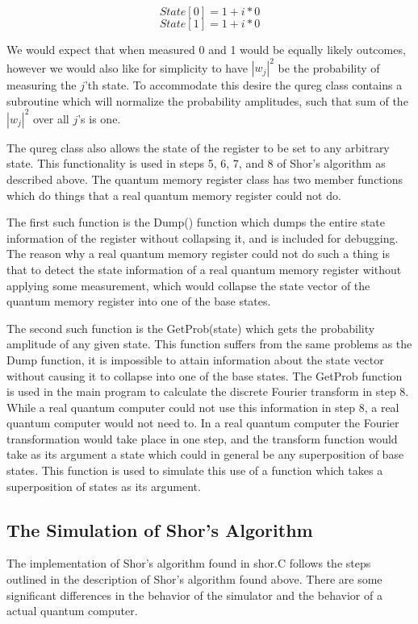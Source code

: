 \documentclass[]{article}
\begin{document}
\[State[0] = 1 + i * 0\] 
\[State[1] = 1 + i * 0\] 

We would expect that when measured 0 and 1 would be equally likely
outcomes, however we would also like for simplicity to have
$|w_{j}|^{2}$ be the probability of measuring the $j$'th state. To
accommodate this desire the qureg class contains a subroutine which
will normalize the probability amplitudes, such that sum of the
$|w_{j}|^{2}$ over all $j$'s is one.

The qureg class also allows the state of the register to be set to any
arbitrary state.  This functionality is used in steps 5, 6, 7, and 8
of Shor's algorithm as described above.  The quantum memory register
class has two member functions which do things that a real quantum
memory register could not do.

The first such function is the Dump() function which dumps the entire
state information of the register without collapsing it, and is
included for debugging.  The reason why a real quantum memory register
could not do such a thing is that to detect the state information of a
real quantum memory register without applying some measurement, which
would collapse the state vector of the quantum memory register into
one of the base states.

The second such function is the GetProb(state) which gets the
probability amplitude of any given state.  This function suffers from
the same problems as the Dump function, it is impossible to attain
information about the state vector without causing it to collapse into
one of the base states.  The GetProb function is used in the main
program to calculate the discrete Fourier transform in step 8.  While
a real quantum computer could not use this information in step 8, a
real quantum computer would not need to.  In a real quantum computer
the Fourier transformation would take place in one step, and the
transform function would take as its argument a state which could in
general be any superposition of base states.  This function is used to
simulate this use of a function which takes a superposition of states
as its argument.
	
\subsection{The Simulation of Shor's Algorithm}

The implementation of Shor's algorithm found in shor.C follows the
steps outlined in the description of Shor's algorithm found above.
There are some significant differences in the behavior of the
simulator and the behavior of a actual quantum computer.
\end{document}
